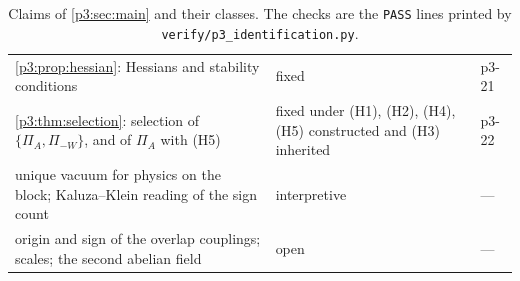\begin{table}[t]
\begin{tabular}{@{}>{\raggedright\arraybackslash}p{8.4cm}>{\raggedright\arraybackslash}p{4.3cm}>{\raggedright\arraybackslash}p{2.2cm}@{}}
\cref{p3:prop:hessian}: Hessians and stability conditions & fixed & p3-21\\
\cref{p3:thm:selection}: selection of $\{\Pi_A,\Pi_{-W}\}$, and of $\Pi_A$ with (H5) & fixed under (H1), (H2), (H4), (H5) constructed and (H3) inherited & p3-22\\
unique vacuum for physics on the block; Kaluza--Klein reading of the sign count & interpretive & ---\\
origin and sign of the overlap couplings; scales; the second abelian field & open & ---\\
\bottomrule
\end{tabular}
\caption{Claims of \cref{p3:sec:main} and their classes. The checks are the \texttt{PASS} lines printed by \texttt{verify/p3\_identification.py}.}
\label{p3:tab:claims}
\end{table}
